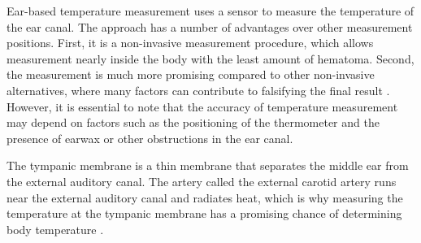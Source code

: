 Ear-based temperature measurement uses a sensor to measure the temperature of the ear canal. 
The approach has a number of advantages over other measurement positions.
First, it is a non-invasive measurement procedure, which allows measurement nearly inside the body with the least amount of hematoma.
Second, the measurement is much more promising compared to other non-invasive alternatives, where many factors can contribute to falsifying the final result \cite{ganioValidityReliabilityDevices2009, craigTemperatureMeasuredAxilla2000}. 
However, it is essential to note that the accuracy of temperature measurement may depend on factors such as the positioning of the thermometer and the presence of earwax or other obstructions in the ear canal.

The tympanic membrane is a thin membrane that separates the middle ear from the external auditory canal. 
The artery called the external carotid artery runs near the external auditory canal and radiates heat, which is why measuring the temperature at the tympanic membrane has a promising chance of determining body temperature \cite{yeohRevisitingTympanicMembrane2017}.

